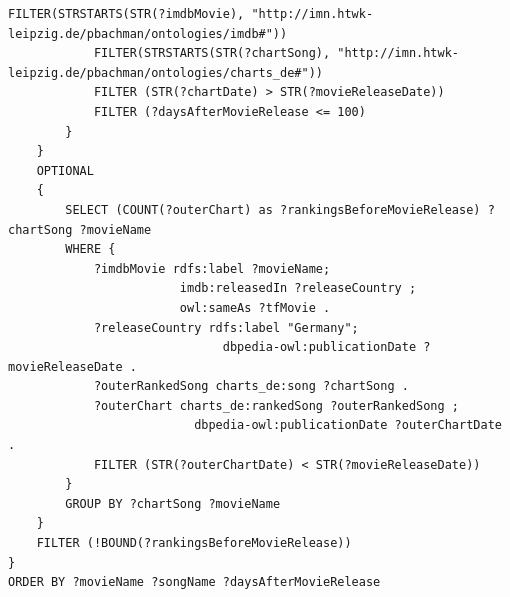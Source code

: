 \documentclass[parskip]{scrartcl}
\begin{document}
\begin{lstlisting}[caption={SPARQL-Anfrage zum Beantworten der Recherchefragestellung}, label={lst:questionSparql}]
            FILTER(STRSTARTS(STR(?imdbMovie), "http://imn.htwk-leipzig.de/pbachman/ontologies/imdb#"))
            FILTER(STRSTARTS(STR(?chartSong), "http://imn.htwk-leipzig.de/pbachman/ontologies/charts_de#"))
            FILTER (STR(?chartDate) > STR(?movieReleaseDate))
            FILTER (?daysAfterMovieRelease <= 100)
        }
    }
    OPTIONAL 
    {
        SELECT (COUNT(?outerChart) as ?rankingsBeforeMovieRelease) ?chartSong ?movieName
        WHERE {           
            ?imdbMovie rdfs:label ?movieName;
                        imdb:releasedIn ?releaseCountry ;
                        owl:sameAs ?tfMovie .
            ?releaseCountry rdfs:label "Germany";
                              dbpedia-owl:publicationDate ?movieReleaseDate .
            ?outerRankedSong charts_de:song ?chartSong .
            ?outerChart charts_de:rankedSong ?outerRankedSong ;
                          dbpedia-owl:publicationDate ?outerChartDate .
            FILTER (STR(?outerChartDate) < STR(?movieReleaseDate))
        }
        GROUP BY ?chartSong ?movieName
    }
    FILTER (!BOUND(?rankingsBeforeMovieRelease))
}
ORDER BY ?movieName ?songName ?daysAfterMovieRelease
\end{lstlisting}



\end{document}
